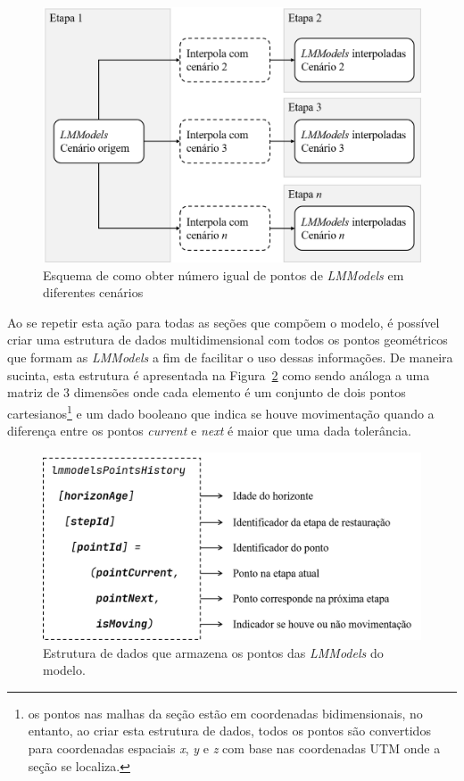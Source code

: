 \begin{figure} [H]
  \begin{center}
    \includegraphics[width=350pt]{images/fig-lmm-interp2}
    \caption{Esquema de como obter número igual de pontos de \textit{LMModels} em diferentes cenários}\label{fig-lmm-interp2}
  \end{center}
\end{figure}

Ao se repetir esta ação para todas as seções que compõem o modelo, é possível criar uma estrutura de dados multidimensional com todos os pontos geométricos que formam as \textit{LMModels} a fim de facilitar o uso dessas informações. De maneira sucinta, esta estrutura é apresentada na Figura~\ref{fig-lmm-data-structure} como sendo análoga a uma matriz de 3 dimensões onde cada elemento é um conjunto de dois pontos cartesianos\footnote{os pontos nas malhas da seção estão em coordenadas bidimensionais, no entanto, ao criar esta estrutura de dados, todos os pontos são convertidos para coordenadas espaciais \textit{x}, \textit{y} e \textit{z} com base nas coordenadas UTM onde a seção se localiza.} e um dado booleano que indica se houve movimentação quando a diferença entre os pontos \textit{current} e \textit{next} é maior que uma dada tolerância.

\begin{figure} [H]
  \begin{center}
    \includegraphics[width=350pt]{images/fig-lmm-data-structure}
    \caption{Estrutura de dados que armazena os pontos das \textit{LMModels} do modelo.}\label{fig-lmm-data-structure}
  \end{center}
\end{figure}

